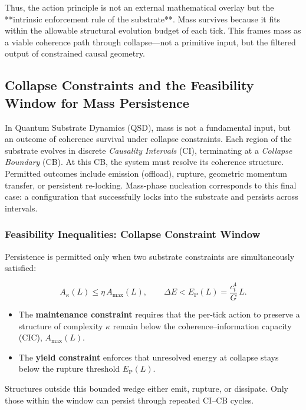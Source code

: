 \documentclass[preprints,article,submit,pdftex,moreauthors]{Definitions/mdpi}
\begin{document}
Thus, the action principle is not an external mathematical overlay but the **intrinsic enforcement rule of the substrate**. Mass survives because it fits within the allowable structural evolution budget of each tick. This frames mass as a viable coherence path through collapse—not a primitive input, but the filtered output of constrained causal geometry.

\subsection{Collapse Constraints and the Feasibility Window for Mass Persistence}

In Quantum Substrate Dynamics (QSD), mass is not a fundamental input, but an outcome of coherence survival under collapse constraints. Each region of the substrate evolves in discrete \emph{Causality Intervals} (CI), terminating at a \emph{Collapse Boundary} (CB). At this CB, the system must resolve its coherence structure. Permitted outcomes include emission (offload), rupture, geometric momentum transfer, or persistent re-locking. Mass-phase nucleation corresponds to this final case: a configuration that successfully locks into the substrate and persists across intervals.

\subsubsection*{Feasibility Inequalities: Collapse Constraint Window}

Persistence is permitted only when two substrate constraints are simultaneously satisfied:

\begin{equation}
A_\kappa(L) \leq \eta\,A_{\max}(L), 
\qquad 
\Delta E < E_{\mathrm{P}}(L) = \frac{c_t^4}{G}\,L.
\end{equation}

\begin{itemize}
    \item The \textbf{maintenance constraint} requires that the per-tick action to preserve a structure of complexity \( \kappa \) remain below the coherence–information capacity (CIC), \( A_{\max}(L) \).
    \item The \textbf{yield constraint} enforces that unresolved energy at collapse stays below the rupture threshold \( E_{\mathrm{P}}(L) \).
\end{itemize}

Structures outside this bounded wedge either emit, rupture, or dissipate. Only those within the window can persist through repeated CI--CB cycles.
\end{document}
